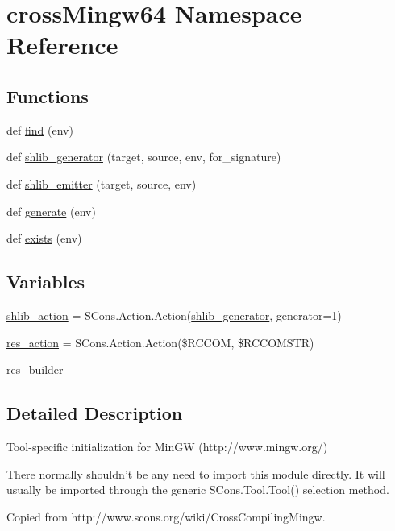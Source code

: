 \hypertarget{namespacecross_mingw64}{}\section{cross\+Mingw64 Namespace Reference}
\label{namespacecross_mingw64}
\subsection*{Functions}
\begin{DoxyCompactItemize}
\item 
def \hyperlink{namespacecross_mingw64_a84c3f8f0d87d5bc059474dd42d10482b}{find} (env)
\item 
def \hyperlink{namespacecross_mingw64_a078e1feb668ee00e84fa946c0fb90467}{shlib\+\_\+generator} (target, source, env, for\+\_\+signature)
\item 
def \hyperlink{namespacecross_mingw64_a96e2ee7701e4a4a872039e950253dba6}{shlib\+\_\+emitter} (target, source, env)
\item 
def \hyperlink{namespacecross_mingw64_a7a1167d759629db2254bba9016dab4ad}{generate} (env)
\item 
def \hyperlink{namespacecross_mingw64_a053a10061494319fb27056b20fe0865b}{exists} (env)
\end{DoxyCompactItemize}
\subsection*{Variables}
\begin{DoxyCompactItemize}
\item 
\hyperlink{namespacecross_mingw64_ac946b6b5bf9df0ad25ea41778a113f10}{shlib\+\_\+action} = S\+Cons.\+Action.\+Action(\hyperlink{namespacecross_mingw64_a078e1feb668ee00e84fa946c0fb90467}{shlib\+\_\+generator}, generator=1)
\item 
\hyperlink{namespacecross_mingw64_a372b7ec410450bc1869a584bc1ea2313}{res\+\_\+action} = S\+Cons.\+Action.\+Action(\textquotesingle{}\$R\+C\+C\+OM\textquotesingle{}, \textquotesingle{}\$R\+C\+C\+O\+M\+S\+TR\textquotesingle{})
\item 
\hyperlink{namespacecross_mingw64_aabcfbbcefd8ba4a63f685e8982bfc1b3}{res\+\_\+builder}
\end{DoxyCompactItemize}


\subsection{Detailed Description}
\begin{DoxyVerb}Tool-specific initialization for MinGW (http://www.mingw.org/)

There normally shouldn't be any need to import this module directly.
It will usually be imported through the generic SCons.Tool.Tool()
selection method.

Copied from http://www.scons.org/wiki/CrossCompilingMingw.
\end{DoxyVerb}
 

